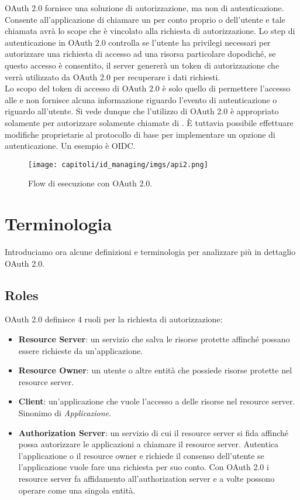 OAuth 2.0 fornisce una soluzione di autorizzazione, ma non di autenticazione. Consente
all'applicazione di chiamare un \api{} per conto proprio o dell'utente e tale chiamata
avrà lo scope che è vincolato alla richiesta di autorizzazione. Lo step di
autenticazione in OAuth 2.0 controlla se l'utente ha privilegi necessari per
autorizzare una richiesta di accesso ad una risorsa particolare dopodiché, se
questo accesso è consentito, il server genererà un token di autorizzazione che
verrà utilizzato da OAuth 2.0 per recuperare i dati richiesti.\\
Lo scopo del token di accesso di OAuth 2.0 è solo quello di permettere l'accesso alle
\api{} e non fornisce alcuna informazione riguardo l'evento di autenticazione o riguardo
all'utente.
Si vede dunque che l'utilizzo di OAuth 2.0 è appropriato solamente per autorizzare
solamente chiamate di \api{}. È tuttavia possibile effettuare modifiche proprietarie al
protocollo di base per implementare un opzione di autenticazione. Un esempio è
OIDC.

\begin{figure}[H]
      \centering
      \texttt{[image: capitoli/id\_managing/imgs/api2.png]}
      \caption{Flow di esecuzione con OAuth 2.0.}
\end{figure}

\section{Terminologia}

Introduciamo ora alcune definizioni e terminologia per analizzare più in dettaglio
OAuth 2.0.

\subsection{Roles}

OAuth 2.0 definisce 4 ruoli per la richiesta di autorizzazione:

\begin{itemize}
      \item \textbf{Resource Server}: un servizio che salva le risorse protette affinché
            possano essere richieste da un'applicazione.
      \item \textbf{Resource Owner}: un utente o altre entità che possiede risorse protette
            nel resource server.
      \item \textbf{Client}: un'applicazione che vuole l'accesso a delle risorse nel
            resource server. Sinonimo di \textit{Applicazione}.
      \item \textbf{Authorization Server}: un servizio di cui il resource server si fida
            affinché possa autorizzare le applicazioni a chiamare il resource server.
            Autentica l'applicazione o il resource owner e richiede il consenso dell'utente
            se l'applicazione
            vuole fare una richiesta per suo conto. Con OAuth 2.0 i resource server fa
            affidamento all'authorization server e a volte possono operare come una
            singola entità.
\end{itemize}

